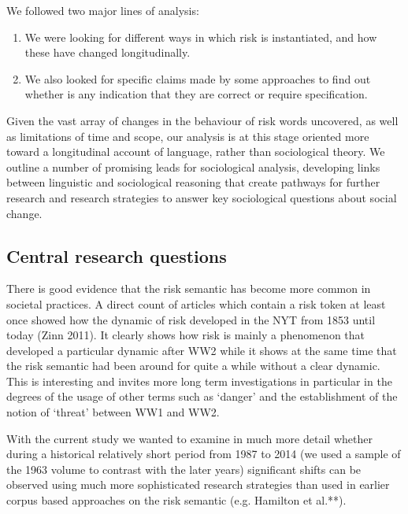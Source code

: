 We followed two major lines of analysis:

\begin{enumerate}
\item We were looking for different ways in which risk is instantiated, and how these have changed longitudinally.
\item We also looked for specific claims made by some approaches to find out whether is any indication that they are correct or require specification. 
\end{enumerate}
%
Given the vast array of changes in the behaviour of risk words uncovered, as well as limitations of time and scope, our analysis is at this stage oriented more toward a longitudinal account of language, rather than sociological theory. We outline a number of promising leads for sociological analysis, developing links between linguistic and sociological reasoning that create pathways for further research and research strategies to answer key sociological questions about social change.

\subsection{Central research questions}

There is good evidence that the risk semantic has become more common in societal practices. A direct count of articles which contain a risk token at least once showed how the dynamic of risk developed in the NYT from 1853 until today (Zinn 2011). It clearly shows how risk is mainly a phenomenon that developed a particular dynamic after WW2 while it shows at the same time that the risk semantic had been around for quite a while without a clear dynamic. This is interesting and invites more long term investigations in particular in the degrees of the usage of other terms such as `danger' and the establishment of the notion of `threat' between WW1 and WW2.

With the current study we wanted to examine in much more detail whether during a historical relatively short period from 1987 to 2014 (we used a sample of the 1963 volume to contrast with the later years) significant shifts can be observed using much more sophisticated research strategies than used in earlier corpus based approaches on the risk semantic (e.g. Hamilton et al.**).


